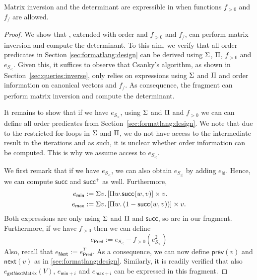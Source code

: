 %

\begin{proposition}
Matrix inversion and the determinant are expressible in  \langmprod{} when functions
$f_{>0}$ and $f_/$ are allowed.
\end{proposition}
\begin{proof}
We show that \langmprod, extended with order and $f_{>0}$ and $f_/$, 
can perform matrix inversion and compute the determinant. 
To this aim, we verify that all order
predicates in Section \ref{sec:formatlang:design} can be derived using $\Sigma$, $\Pi$, $f_{>0}$ and 
$e_{S_{<}}$. Given this, it suffices to observe that Csanky's algorithm, as shown in Section~\ref{sec:queries:inverse}, only relies on expressions using $\Sigma$ and $\Pi$ and order information on canonical vectors and $f_/$.
As consequence, the fragment can perform matrix inversion and compute the determinant.

It remains to show that if we have $e_{S_{<}}$, using $\Sigma$ and $\Pi$ and $f_{>0}$ we can
can define all order predicates from Section~\ref{sec:formatlang:design}. We note that due to the restricted for-loops
in $\Sigma$ and $\Pi$, we do not have access to the intermediate
result in the iterations and as such, it is unclear whether order information can be computed. This is why
we assume access to $e_{S_<}$.

We first remark that if we have $e_{S_{<}}$, we can also obtain
 $e_{S_{\leq}}$ by adding $e_{\mathsf{Id}}$. Hence,
we can compute $\mathsf{succ}$ and $\mathsf{succ}^+$ as well. Furthermore, 
\begin{align*}
  e_{\mathsf{min}}&:=\Sigma v. \left[ \Pi w. \mathsf{succ}(w,v)\right] \times v. \\
  e_{\mathsf{max}}&:=\Sigma v. \left[ \Pi w. \left( 1-\mathsf{succ}(w,v) \right) \right] \times v.
\end{align*}
Both expressions are only using $\Sigma$ and $\Pi$ and $\mathsf{succ}$, so are in our fragment.
Furthermore, if we have $f_{>0}$ then we can define
$$
e_{\mathsf{Pred}}:= e_{S_{<}}- f_{>0}(e_{S_{<}}^2)
$$
Also, recall that  $e_{\mathsf{Next}}:=e_{\mathsf{Pred}}^T$. As a consequence, 
we can now define $\mathsf{prev}(v)$ and $\mathsf{next}(v)$ as in \ref{sec:formatlang:design}. Similarly,
it is readily verified that also 
$e_{\mathsf{getNextMatrix}}(V)$, $e_{\mathsf{min}+i}$ and $e_{\mathsf{max}+i}$ can be expressed
in this fragment.
\end{proof}
